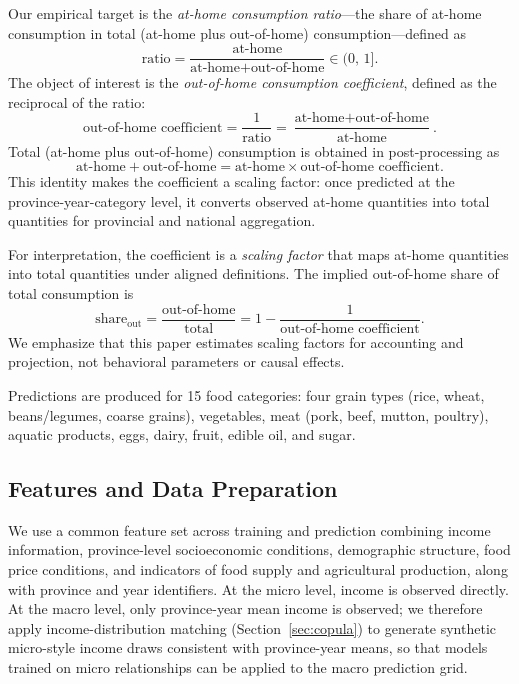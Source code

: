 \documentclass[12pt,a4paper]{article}
\begin{document}
Our empirical target is the \emph{at-home consumption ratio}---the share of at-home consumption in total (at-home plus out-of-home) consumption---defined as
\begin{equation}
  \text{ratio} = \frac{\text{at-home}}{\text{at-home} + \text{out-of-home}} \in (0,\,1].
\end{equation}
The object of interest is the \emph{out-of-home consumption coefficient}, defined as the reciprocal of the ratio:
\begin{equation}
  \text{out-of-home coefficient} = \frac{1}{\text{ratio}} = \frac{\text{at-home} + \text{out-of-home}}{\text{at-home}}.
\end{equation}
Total (at-home plus out-of-home) consumption is obtained in post-processing as
\begin{equation}
  \text{at-home} + \text{out-of-home} = \text{at-home} \times \text{out-of-home coefficient}.
\end{equation}
This identity makes the coefficient a scaling factor: once predicted at the province-year-category level, it converts observed at-home quantities into total quantities for provincial and national aggregation.

For interpretation, the coefficient is a \emph{scaling factor} that maps at-home quantities into total quantities under aligned definitions. The implied out-of-home share of total consumption is
\begin{equation}
  \text{share}_{\text{out}} = \frac{\text{out-of-home}}{\text{total}} = 1 - \frac{1}{\text{out-of-home coefficient}}.
\end{equation}
We emphasize that this paper estimates scaling factors for accounting and projection, not behavioral parameters or causal effects.

Predictions are produced for 15 food categories: four grain types (rice, wheat, beans/legumes, coarse grains), vegetables, meat (pork, beef, mutton, poultry), aquatic products, eggs, dairy, fruit, edible oil, and sugar.

\subsection{Features and Data Preparation}

We use a common feature set across training and prediction combining income information, province-level socioeconomic conditions, demographic structure, food price conditions, and indicators of food supply and agricultural production, along with province and year identifiers. At the micro level, income is observed directly. At the macro level, only province-year mean income is observed; we therefore apply income-distribution matching (Section~\ref{sec:copula}) to generate synthetic micro-style income draws consistent with province-year means, so that models trained on micro relationships can be applied to the macro prediction grid.
\end{document}
